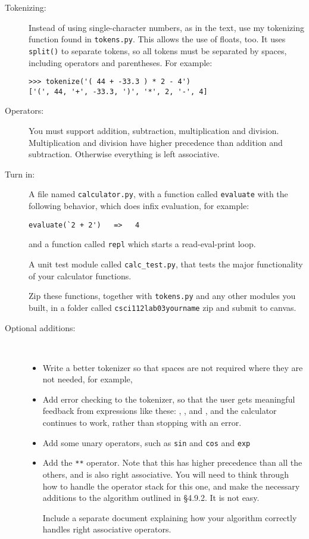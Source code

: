\documentclass{article}
\newcommand{\bi}{\begin{itemize}}
\newcommand{\li}{\item}
\newcommand{\ei}{\end{itemize}}
\begin{document}
\begin{description}
\begin{enumerate}
\end{enumerate}


\item[Tokenizing:]  Instead of using single-character numbers, as in the text,
use my tokenizing function found in \lstinline{tokens.py}.  This allows the use
of floats, too.   It uses \lstinline{split()} to separate tokens, so all
tokens must be separated by spaces, including operators and parentheses.
For example:
\begin{lstlisting}
>>> tokenize('( 44 + -33.3 ) * 2 - 4')
['(', 44, '+', -33.3, ')', '*', 2, '-', 4]
\end{lstlisting}


\item[Operators:] You must support addition, subtraction, multiplication
and division.  Multiplication and division have higher precedence than 
addition and subtraction.  Otherwise everything is left associative.

\item[Turn in:]  A file named \lstinline{calculator.py}, with a function
called \lstinline{evaluate} with the following behavior, which does infix
evaluation, for example:
\begin{lstlisting}
evaluate(`2 + 2')   =>   4
\end{lstlisting}
and a function called \lstinline{repl} which starts a read-eval-print loop.

A unit test module called \lstinline{calc_test.py}, that tests the major
functionality of your calculator functions.

Zip these functions, together with \lstinline{tokens.py} and any other
modules you built, in a folder called \lstinline{csci112lab03yourname} zip and submit to canvas.

\item[Optional additions:]~ 

\bi
\li Write a better tokenizer so that spaces are not required where they are not
needed, for example, 
\li Add error checking to the tokenizer, so that the user gets meaningful
feedback from expressions like these:
, 
, and
,
and the calculator continues to work, rather than stopping with an error.


\li Add some unary operators, such as \lstinline{sin} and \lstinline{cos} and \lstinline{exp}


\li Add the \lstinline{**} operator.  Note that this has higher precedence
than all the others, and is also right associative.  You will need to think through
how to handle the operator stack for this one, and make the necessary
additions to the algorithm outlined in \S 4.9.2.  It is not easy.

Include  a separate document explaining how your
algorithm correctly handles right associative operators.




\ei


\end{description}
\end{document}

